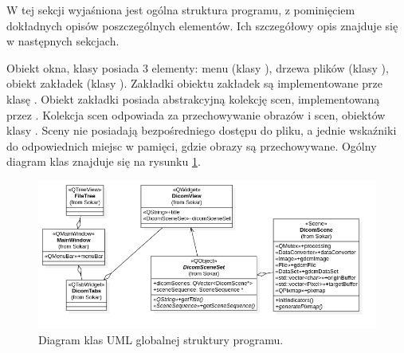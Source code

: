 
\par
W tej sekcji wyjaśniona jest ogólna struktura programu, z pominięciem dokładnych opisów poszczególnych elementów.
Ich szczegółowy opis znajduje się w następnych sekcjach.
\par
Obiekt okna, klasy  posiada 3 elementy: menu (klasy ), drzewa plików (klasy ), obiekt zakładek (klasy ).
Zakładki obiektu zakładek są implementowane prze klasę .
Obiekt zakładki posiada abstrakcyjną kolekcję scen, implementowaną przez .
Kolekcja scen odpowiada za przechowywanie obrazów i scen, obiektów klasy .
Sceny nie posiadają bezpośredniego dostępu do pliku, a jednie wskaźniki do odpowiednich miejsc w pamięci, gdzie obrazy są przechowywane.
Ogólny diagram klas znajduje się na rysunku \ref{fig:uml-global-sturcture}.

\begin{figure}[!htbp]
    \centering
    \includegraphics[width=\textwidth]{img/uml/global-sturcture.png}
    \caption{Diagram klas UML globalnej struktury programu.}
    \label{fig:uml-global-sturcture}
\end{figure}
